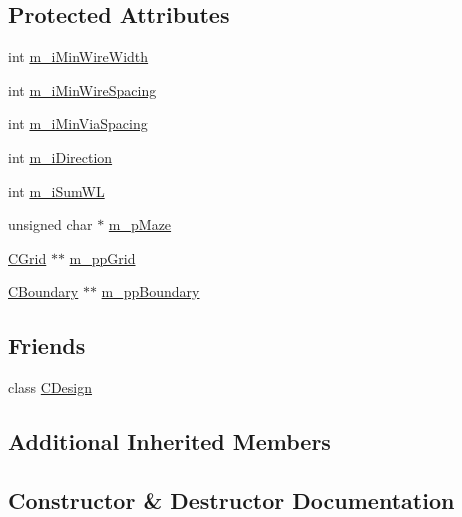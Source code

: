 \subsection*{Protected Attributes}
\begin{DoxyCompactItemize}
\item 
int \mbox{\hyperlink{classCLayer_a28f4f5a3f5f01db3e32e18b65bf9f3f9}{m\+\_\+i\+Min\+Wire\+Width}}
\item 
int \mbox{\hyperlink{classCLayer_afd0e4e879b3d329c009e0a5acd7dc81d}{m\+\_\+i\+Min\+Wire\+Spacing}}
\item 
int \mbox{\hyperlink{classCLayer_a6b5e909e6de7ce5ffe49441bda5724e5}{m\+\_\+i\+Min\+Via\+Spacing}}
\item 
int \mbox{\hyperlink{classCLayer_a32c10bee607b233b00c80a0c32fc2c49}{m\+\_\+i\+Direction}}
\item 
int \mbox{\hyperlink{classCLayer_aa204da6df07e358de097e9cb3688561e}{m\+\_\+i\+Sum\+WL}}
\item 
unsigned char $\ast$ \mbox{\hyperlink{classCLayer_a21ed1da429a1e39ceba329c636a14339}{m\+\_\+p\+Maze}}
\item 
\mbox{\hyperlink{classCGrid}{C\+Grid}} $\ast$$\ast$ \mbox{\hyperlink{classCLayer_acaee54a8cb6a0dc8a924ad8dc7800f78}{m\+\_\+pp\+Grid}}
\item 
\mbox{\hyperlink{classCBoundary}{C\+Boundary}} $\ast$$\ast$ \mbox{\hyperlink{classCLayer_a0af07548ed6901bfa6cb07df6bb61d05}{m\+\_\+pp\+Boundary}}
\end{DoxyCompactItemize}
\subsection*{Friends}
\begin{DoxyCompactItemize}
\item 
class \mbox{\hyperlink{classCLayer_a456d9ce965c42b2974ac760295a30cc6}{C\+Design}}
\end{DoxyCompactItemize}
\subsection*{Additional Inherited Members}


\subsection{Constructor \& Destructor Documentation}
\mbox{\label{classCLayer_a6156e0a33ab7511c751d8ddc8975c9a3}} 

